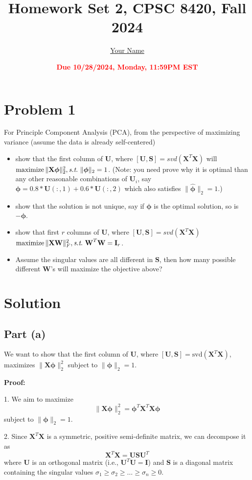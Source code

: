 \documentclass[11pt]{article}
\title{{\bf Homework Set 2, CPSC 8420, Fall 2024}} %
\author{\Large\underline{Your Name}}
\date{\textbf{\Large\textcolor{red}{Due 10/28/2024, Monday, 11:59PM EST}}} %
\newcommand{\maximize}{\operatorname*{maximize}}
\newcommand{\mtx}[1]{\mathbf{#1}}
\def \mI {\mtx{I}}
\def \mU {\mtx{U}}
\def \mS {\mtx{S}}
\def \mW {\mtx{W}}
\def \mX {\mtx{X}}
\begin{document}
	\maketitle
	

	\section*{Problem 1}
	For Principle Component Analysis (PCA), from the perspective of maximizing variance (assume the data is already self-centered)
	\begin{itemize}
		\item show that the first column of $\mU$, where $[\mU,\mS]=svd(\mX^T\mX)$ will $\maximize \|\mX \bm{\phi}\|^2_2, \st \ \|\bm{\phi}\|_2=1$. (Note: you need prove why it is optimal than any other reasonable combinations of $\mU_i$, say $\hat{\bm{\phi}}=0.8*\mU(:,1)+0.6*\mU(:,2)$ which also  satisfies $\|\hat{\bm{\phi}}\|_2=1$.) 
		\item show that the solution is not unique, say if $\bm{\phi}$ is the optimal solution, so is $-\bm{\phi}$. 
		\item show that first $r$  columns of $\mU$, where $[\mU,\mS]=svd(\mX^T\mX)$ $\maximize \|\mX \bm{\mW}\|^2_F, \st \ \bm{\mW}^T\bm{\mW}=\mI_r$.
		\item Assume the singular values are all different in $\mS$, then how many possible different $\mW$'s will maximize the objective above?
	\end{itemize} 
	
	\section*{Solution}

\subsection*{Part (a)}
We want to show that the first column of $\mU$, where $[\mU, \mS] = \text{svd}(\mX^T \mX)$, maximizes $\|\mX \bm{\phi}\|_2^2$ subject to $\|\bm{\phi}\|_2 = 1$.

\textbf{Proof:}

1. We aim to maximize
   \[
   \|\mX \bm{\phi}\|_2^2 = \bm{\phi}^T \mX^T \mX \bm{\phi}
   \]
   subject to $\|\bm{\phi}\|_2 = 1$.

2. Since $\mX^T \mX$ is a symmetric, positive semi-definite matrix, we can decompose it as
   \[
   \mX^T \mX = \mU \mS \mU^T
   \]
   where $\mU$ is an orthogonal matrix (i.e., $\mU^T \mU = \mI$) and $\mS$ is a diagonal matrix containing the singular values $\sigma_1 \geq \sigma_2 \geq \dots \geq \sigma_n \geq 0$.
\end{document}
